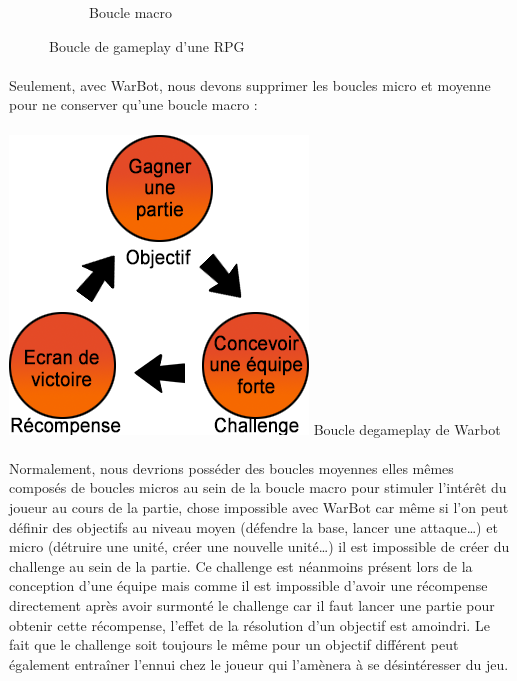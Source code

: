 \documentclass{report}
\begin{document}
\begin{figure}
\begin{adjustwidth}{-8em}{-7em}
\begin{subfigure}{.5\textwidth}
  \caption{Boucle macro}
  \label{fig:sfig3}
\end{subfigure}
\caption{Boucle de gameplay d'une RPG}
\label{fig:fig}
\end{adjustwidth}
\end{figure}
\paragraph{}

Seulement, avec WarBot, nous devons supprimer les boucles micro et moyenne pour ne conserver qu’une boucle macro :

\paragraph{}
\begin{center}
\includegraphics[scale=0.7]{DATA/macroWarBot.png}
 {Boucle degameplay de Warbot}
\end{center}
\paragraph{}

Normalement, nous devrions posséder des boucles moyennes elles mêmes composés de boucles micros au sein de la boucle macro pour stimuler l’intérêt du joueur au cours de la partie, chose impossible avec WarBot car même si l’on peut définir des objectifs au niveau moyen (défendre la base, lancer une attaque…) et micro (détruire une unité, créer une nouvelle unité…) il est impossible de créer du challenge au sein de la partie. Ce challenge est néanmoins présent lors de la conception d’une équipe mais comme il est impossible d’avoir une récompense directement après avoir surmonté le challenge car il faut lancer une partie pour obtenir cette récompense, l’effet de la résolution d’un objectif est amoindri. Le fait que le challenge soit toujours le même pour un objectif différent peut également entraîner l’ennui chez le joueur qui l’amènera à se désintéresser du jeu.
\end{document}
